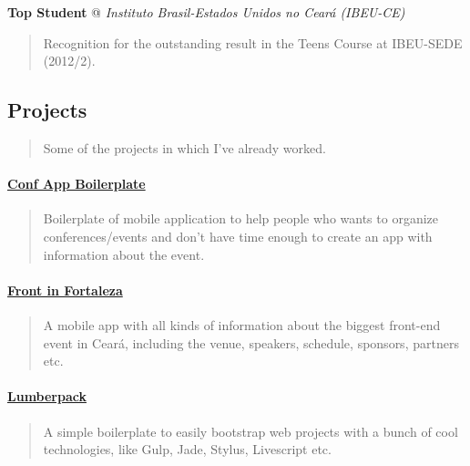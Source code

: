 \documentclass[]{article}
\let\oldparagraph\paragraph
\renewcommand{\paragraph}[1]{\oldparagraph{#1}\mbox{}}
\begin{document}
\textbf{Top Student} @ \emph{Instituto Brasil-Estados Unidos no Ceará
(IBEU-CE)}

\begin{quote}
Recognition for the outstanding result in the Teens Course at IBEU-SEDE
(2012/2).
\end{quote}

\subsection{Projects}\label{projects}

\begin{quote}
Some of the projects in which I've already worked.
\end{quote}

\paragraph{\texorpdfstring{\href{https://github.com/devevents/conf-app-boilerplate}{Conf
App Boilerplate}}{Conf App Boilerplate}}\label{conf-app-boilerplate}

\begin{quote}
Boilerplate of mobile application to help people who wants to organize
conferences/events and don't have time enough to create an app with
information about the event.
\end{quote}

\paragraph{\texorpdfstring{\href{https://play.google.com/store/apps/details?id=com.devevents.frontinfortaleza}{Front
in Fortaleza}}{Front in Fortaleza}}\label{front-in-fortaleza}

\begin{quote}
A mobile app with all kinds of information about the biggest front-end
event in Ceará, including the venue, speakers, schedule, sponsors,
partners etc.
\end{quote}

\paragraph{\texorpdfstring{\href{https://github.com/mabrasil/lumberpack}{Lumberpack}}{Lumberpack}}\label{lumberpack}

\begin{quote}
A simple boilerplate to easily bootstrap web projects with a bunch of
cool technologies, like Gulp, Jade, Stylus, Livescript etc.
\end{quote}
\end{document}
